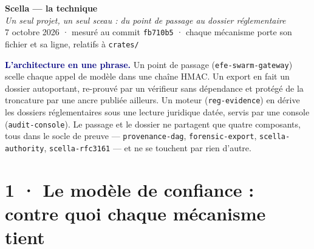 \documentclass[10pt]{extarticle}
\newcommand{\code}[1]{\texttt{\small #1}}
\newcommand{\mm}[1]{\textbf{\textcolor{navy}{#1}}}
\begin{document}
\begin{center}
{\LARGE\bfseries\color{navy} Scella --- la technique}\\[3pt]
{\large\color{grey}\itshape Un seul projet, un seul sceau : du point de passage au dossier réglementaire}\\[3pt]
{\footnotesize\color{grey} 7 octobre 2026 \; · \; mesuré au commit \texttt{fb710b5} \; · \; chaque mécanisme porte son
fichier et sa ligne, relatifs à \texttt{crates/}}
\end{center}
\vspace{1pt}

\begin{these}
\mm{L'architecture en une phrase.} Un point de passage (\code{efe-swarm-gateway}) scelle chaque appel de modèle dans
une chaîne HMAC. Un export en fait un dossier autoportant, re-prouvé par un vérifieur sans dépendance et protégé de la
troncature par une ancre publiée ailleurs. Un moteur (\code{reg-evidence}) en dérive les dossiers réglementaires sous
une lecture juridique datée, servis par une console (\code{audit-console}). Le passage et le dossier ne partagent que
quatre composants, tous dans le socle de preuve --- \code{provenance-dag}, \code{forensic-export},
\code{scella-authority}, \code{scella-rfc3161} --- et ne se touchent par rien d'autre.
\end{these}

\section{1 · Le modèle de confiance : contre quoi chaque mécanisme tient}
\end{document}

